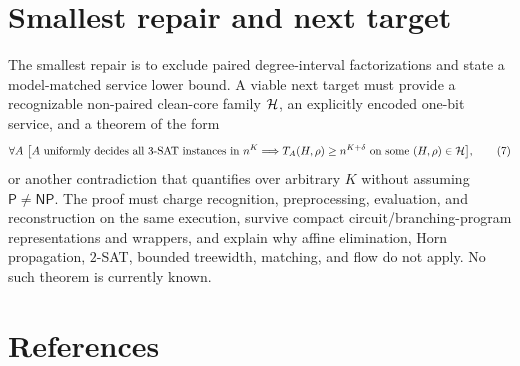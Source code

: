 \documentclass[11pt]{article}
\begin{document}
\section{Smallest repair and next target}

The smallest repair is to exclude paired degree-interval factorizations and
state a model-matched service lower bound. A viable next target must provide
a recognizable non-paired clean-core family \({\cal H}\), an explicitly
encoded one-bit service, and a theorem of the form
\[
\forall A\ \bigl[
 A\text{ uniformly decides all }3\text{-SAT instances in }n^K
 \Longrightarrow
 T_A(H,\rho)\ge n^{K+\delta}
\text{ on some }(H,\rho)\in{\cal H}
\bigr],
\tag{7}
\]
or another contradiction that quantifies over arbitrary \(K\) without
assuming \(\mathsf{P}\ne\mathsf{NP}\). The proof must charge recognition,
preprocessing, evaluation, and reconstruction on the same execution, survive
compact circuit/branching-program representations and wrappers, and explain
why affine elimination, Horn propagation, \(2\)-SAT, bounded treewidth,
matching, and flow do not apply. No such theorem is currently known.

\section{References}
\end{document}

